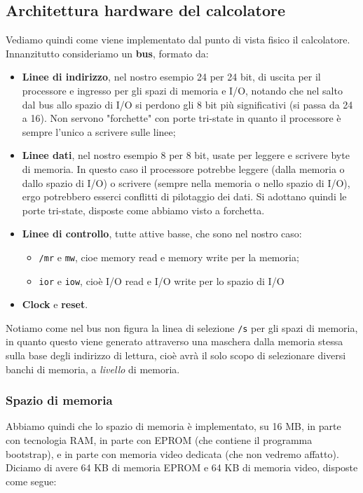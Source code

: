 \documentclass[a4paper,11pt]{article}
\begin{document}
\subsection{Architettura hardware del calcolatore}
Vediamo quindi come viene implementato dal punto di vista fisico il calcolatore.
Innanzitutto consideriamo un \textbf{bus}, formato da:
\begin{itemize}
\item \textbf{Linee di indirizzo}, nel nostro esempio 24 per 24 bit, di uscita per il processore e ingresso per gli spazi di memoria e I/O, notando che nel salto dal bus allo spazio di I/O si perdono gli 8 bit più significativi (si passa da 24 a 16).
Non servono "forchette" con porte tri-state in quanto il processore è sempre l'unico a scrivere sulle linee;
\item \textbf{Linee dati}, nel nostro esempio 8 per 8 bit, usate per leggere e scrivere byte di memoria.
	In questo caso il processore potrebbe leggere (dalla memoria o dallo spazio di I/O) o scrivere (sempre nella memoria o nello spazio di I/O), ergo potrebbero esserci conflitti di pilotaggio dei dati.
	Si adottano quindi le porte tri-state, disposte come abbiamo visto a forchetta.
\item \textbf{Linee di controllo}, tutte attive basse, che sono nel nostro caso:
	\begin{itemize}
		\item \lstinline|/mr| e \lstinline|mw|, cioe memory read e memory write per la memoria;
		\item \lstinline|ior| e \lstinline|iow|, cioè I/O read e I/O write per lo spazio di I/O
	\end{itemize}
\item \textbf{Clock} e \textbf{reset}.
\end{itemize}

Notiamo come nel bus non figura la linea di selezione \lstinline|/s| per gli spazi di memoria, in quanto questo viene generato attraverso una maschera dalla memoria stessa sulla base degli indirizzo di lettura, cioè avrà il solo scopo di selezionare diversi banchi di memoria, a \textit{livello} di memoria.

\subsubsection{Spazio di memoria}
Abbiamo quindi che lo spazio di memoria è implementato, su 16 MB, in parte con tecnologia RAM, in parte con EPROM (che contiene il programma bootstrap), e in parte con memoria video dedicata (che non vedremo affatto).
Diciamo di avere 64 KB di memoria EPROM e 64 KB di memoria video, disposte come segue:
\end{document}
